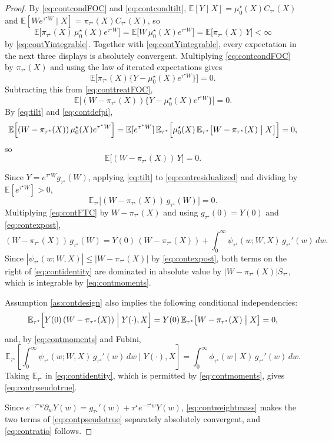 \documentclass[11pt]{article}
\theoremstyle{definition}
\theoremstyle{plain}
\newcommand{\E}{\mathbb{E}}
\newcommand{\1}{\mathbf{1}}
\begin{document}
\begin{proof}
By \eqref{eq:contcondFOC} and \eqref{eq:contcondtilt}, $\E[Y\mid X]=\mu_0^\star(X)C_{\tau^\star}(X)$ and $\E[We^{\tau^\star W}\mid X]=\pi_{\tau^\star}(X)C_{\tau^\star}(X)$, so
\[
\E\bigl[\pi_{\tau^\star}(X)\,\mu_0^\star(X)e^{\tau^\star W}\bigr]
=\E\bigl[W\,\mu_0^\star(X)e^{\tau^\star W}\bigr]
=\E\bigl[\pi_{\tau^\star}(X)\,Y\bigr]<\infty
\]
by \eqref{eq:contYintegrable}.  Together with \eqref{eq:contYintegrable}, every expectation in the next three displays is absolutely convergent.  Multiplying \eqref{eq:contcondFOC} by $\pi_{\tau^\star}(X)$ and using the law of iterated expectations gives
\[
\E\Big[\pi_{\tau^\star}(X)\bigl\{Y-\mu_0^\star(X)e^{\tau^\star W}\bigr\}\Big]=0 .
\]
Subtracting this from \eqref{eq:conttreatFOC},
\[
\E\Big[(W-\pi_{\tau^\star}(X))\bigl\{Y-\mu_0^\star(X)e^{\tau^\star W}\bigr\}\Big]=0 .
\]
By \eqref{eq:tilt} and \eqref{eq:contdefpi},
\[
\E\Big[(W-\pi_{\tau^\star}(X))\,\mu_0^\star(X)e^{\tau^\star W}\Big]
=\E[e^{\tau^\star W}]\,\E_{\tau^\star}\Big[\mu_0^\star(X)\,\E_{\tau^\star}\bigl[W-\pi_{\tau^\star}(X)\bigm| X\bigr]\Big]=0 ,
\]
so
\begin{equation}
\E\bigl[(W-\pi_{\tau^\star}(X))\,Y\bigr]=0 .
\label{eq:contresidualized}
\end{equation}

Since $Y=e^{\tau^\star W}g_{\tau^\star}(W)$, applying \eqref{eq:tilt} to \eqref{eq:contresidualized} and dividing by $\E[e^{\tau^\star W}]>0$,
\[
\E_{\tau^\star}\bigl[(W-\pi_{\tau^\star}(X))\,g_{\tau^\star}(W)\bigr]=0 .
\]
Multiplying \eqref{eq:contFTC} by $W-\pi_{\tau^\star}(X)$ and using $g_{\tau^\star}(0)=Y(0)$ and \eqref{eq:contexpost},
\begin{equation}
(W-\pi_{\tau^\star}(X))\,g_{\tau^\star}(W)
=
Y(0)\,(W-\pi_{\tau^\star}(X))
+
\int_0^\infty \psi_{\tau^\star}(w;W,X)\,g_{\tau^\star}'(w)\,dw .
\label{eq:contidentity}
\end{equation}
Since $|\psi_{\tau^\star}(w;W,X)|\le|W-\pi_{\tau^\star}(X)|$ by \eqref{eq:contexpost}, both terms on the right of \eqref{eq:contidentity} are dominated in absolute value by $|W-\pi_{\tau^\star}(X)|\bar S_{\tau^\star}$, which is integrable by \eqref{eq:contmoments}.

Assumption \ref{as:contdesign} also implies the following conditional independencies:
\[
\E_{\tau^\star}\Big[Y(0)\,(W-\pi_{\tau^\star}(X))\;\Big|\;Y(\cdot),X\Big]
=Y(0)\,\E_{\tau^\star}\bigl[W-\pi_{\tau^\star}(X)\bigm| X\bigr]=0 ,
\]
and, by \eqref{eq:contmoments} and Fubini,
\[
\E_{\tau^\star}\left[\int_0^\infty \psi_{\tau^\star}(w;W,X)\,g_{\tau^\star}'(w)\,dw\;\Bigg|\;Y(\cdot),X\right]
=\int_0^\infty \phi_{\tau^\star}(w\mid X)\,g_{\tau^\star}'(w)\,dw .
\]
Taking $\E_{\tau^\star}$ in \eqref{eq:contidentity}, which is permitted by \eqref{eq:contmoments}, gives \eqref{eq:contpseudotrue}.

Since $e^{-\tau^\star w}\partial_wY(w)=g_{\tau^\star}'(w)+\tau^\star e^{-\tau^\star w}Y(w)$, \eqref{eq:contweightmass} makes the two terms of \eqref{eq:contpseudotrue} separately absolutely convergent, and \eqref{eq:contratio} follows.
\end{proof}
\end{document}
